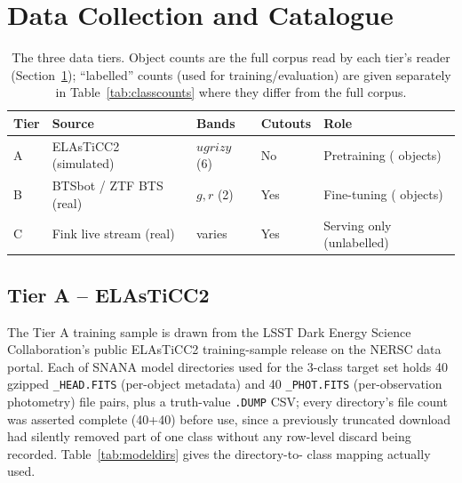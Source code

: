\section{Data Collection and Catalogue}
\label{sec:data}

\begin{table}[htb]
\centering
\caption{The three data tiers. Object counts are the full corpus read by
each tier's reader (Section~\ref{sec:data}); ``labelled'' counts (used for
training/evaluation) are given separately in Table~\ref{tab:classcounts}
where they differ from the full corpus.}
\label{tab:tiers}
\begin{tabular}{lllll}
\toprule
Tier & Source & Bands & Cutouts & Role \\
\midrule
A & ELAsTiCC2 (simulated) & $ugrizy$ (6) & No & Pretraining
  (\TierATotalObjects{} objects) \\
B & BTSbot / ZTF BTS (real) & $g,r$ (2) & Yes & Fine-tuning
  (\TierBNObjTotal{} objects) \\
C & Fink live stream (real) & varies & Yes & Serving only (unlabelled) \\
\bottomrule
\end{tabular}
\end{table}

\subsection{Tier A -- ELAsTiCC2}

The Tier A training sample is drawn from the LSST Dark Energy Science
Collaboration's public ELAsTiCC2 training-sample release on the NERSC data
portal. Each of \TierANumModelDirs{} SNANA model directories used for the
3-class target set holds 40 gzipped \texttt{\_HEAD.FITS} (per-object
metadata) and 40 \texttt{\_PHOT.FITS} (per-observation photometry) file
pairs, plus a truth-value \texttt{.DUMP} CSV; every directory's file count
was asserted complete (40+40) before use, since a previously truncated
download had silently removed part of one class without any row-level
discard being recorded. Table~\ref{tab:modeldirs} gives the directory-to-
class mapping actually used.

